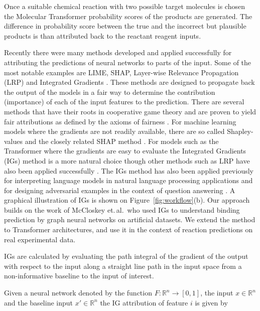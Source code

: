 Once a suitable chemical reaction with two possible target molecules is chosen the Molecular Transformer probability scores of the products are generated. The difference in probability score between the true and the incorrect but plausible products is than attributed back to the reactant reagent inputs.

Recently there were many methods developed and applied successfully for attributing the predictions of neural networks to parts of the input. Some of the most notable examples are LIME, SHAP, Layer-wise Relevance Propagation (LRP) and Integrated Gradients \cite{Ribeiro2016WhyClassifier, Lundberg2017APredictions, Montavon2018MethodsNetworks, Sundararajan2017}. These methods are designed to propagate back the output of the models in a fair way to determine the contribution (importance) of each of the input features to the prediction. There are several methods that have their roots in cooperative game theory and are proven to yield fair attributions as defined by the axioms of fairness \cite{Sundararajan2017}. For machine learning models where the gradients are not readily available, there are so called Shapley-values and the closely related SHAP method \cite{Lundberg2017APredictions}. For models such as the Transformer where the gradients are easy to evaluate the Integrated Gradients (IGs) method is a more natural choice \cite{Sundararajan2017} though other methods such as LRP have also been applied successfully \cite{Karpov2020}. The IGs method has also been applied previously for interpreting language models in natural language processing applications and for designing adversarial examples in the context of question answering \cite{mudrakarta2018did}. A graphical illustration of IGs is shown on Figure~\ref{fig:workflow}(b). Our approach builds on the work of McCloskey et.\,al.\,\cite{McCloskey2019} who used IGs to understand binding prediction by graph neural networks on artificial datasets. We extend the method to Transformer architectures, and use it in the context of reaction predictions on real experimental data.

IGs are calculated by evaluating the path integral of the gradient of the output with respect to the input along a straight line path in the input space from a non-informative baseline to the input of interest.

Given a neural network denoted by the function $F:\mathbb{R}^n\to [0,1]$, the input $x\in\mathbb{R}^n$ and the baseline input $x'\in\mathbb{R}^n$ the IG attribution of feature $i$ is given by

